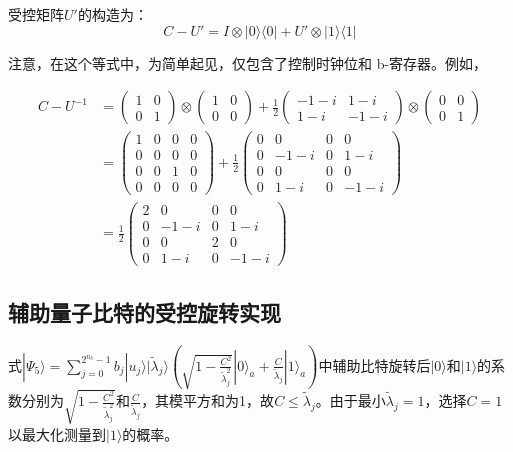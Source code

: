 \documentclass{article}
\begin{document}
受控矩阵\(U'\)的构造为：
\[
C-U' = I \otimes |0\rangle\langle0| + U' \otimes |1\rangle\langle1|
\]

注意，在这个等式中，为简单起见，仅包含了控制时钟位和 b-寄存器。例如，

\[
\begin{aligned} 
C - U^{-1} &= \begin{pmatrix} 1 & 0 \\ 0 & 1 \end{pmatrix} \otimes \begin{pmatrix} 1 & 0 \\ 0 & 0 \end{pmatrix} + \frac{1}{2} \begin{pmatrix} -1 - i & 1 - i \\ 1 - i & -1 - i \end{pmatrix} \otimes \begin{pmatrix} 0 & 0 \\ 0 & 1 \end{pmatrix} \\
&= \begin{pmatrix} 1 & 0 & 0 & 0 \\ 0 & 0 & 0 & 0 \\ 0 & 0 & 1 & 0 \\ 0 & 0 & 0 & 0 \end{pmatrix} + \frac{1}{2} \begin{pmatrix} 0 & 0 & 0 & 0 \\ 0 & -1 - i & 0 & 1 - i \\ 0 & 0 & 0 & 0 \\ 0 & 1 - i & 0 & -1 - i \end{pmatrix} \\
&= \frac{1}{2} \begin{pmatrix} 2 & 0 & 0 & 0 \\ 0 & -1 - i & 0 & 1 - i \\ 0 & 0 & 2 & 0 \\ 0 & 1 - i & 0 & -1 - i \end{pmatrix}
\end{aligned}
\]

\subsection{辅助量子比特的受控旋转实现}

式\(
|\Psi_5\rangle = \sum_{j=0}^{2^{n_b}-1} b_j |u_j\rangle |\tilde{\lambda}_j\rangle \left( \sqrt{1 - \frac{C^2}{\tilde{\lambda}_j^2}} |0\rangle_a + \frac{C}{\tilde{\lambda}_j} |1\rangle_a \right)
\)中辅助比特旋转后\(|0\rangle\)和\(|1\rangle\)的系数分别为\(\sqrt{1 - \frac{C^2}{\tilde{\lambda}_j^2}}\)和\(\frac{C}{\tilde{\lambda}_j}\)，其模平方和为1，故\(C \leq \tilde{\lambda}_j\)。由于最小\(\tilde{\lambda}_j = 1\)，选择\(C = 1\)以最大化测量到\(|1\rangle\)的概率。
\end{document}
